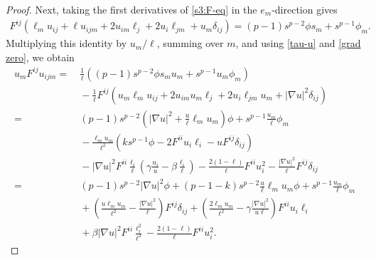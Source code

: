\documentclass[12pt]{amsart}
\numberwithin{equation}{section}
\newcommand{\8}{\infty}
\newcommand{\de}{\delta}
\newcommand{\eq}[1]{\begin{equation}\begin{alignedat}{2}#1\end{alignedat}\end{equation}}
\begin{document}
\begin{proof}
Next, taking the first derivatives of \eqref{s3:F-eq} in the $e_m$-direction gives
\eq{
F^{ij}(\ell_m u_{ij}+\ell u_{ijm}+2u_{im}\ell_j+2u_i\ell_{jm}+u_m\de_{ij})=(p-1)s^{p-2}\phi s_m +s^{p-1}\phi_m.
}
Multiplying this identity by $u_m/\ell$, summing over $m$, and using \eqref{tau-u} and \eqref{grad zero}, we obtain
\eq{
u_mF^{ij} u_{ijm}
=&~\frac{1}{\ell}((p-1)s^{p-2}\phi s_m u_m +s^{p-1}u_m \phi_m)\\
&~-\frac{1}{\ell}F^{ij}(u_m \ell_m u_{ij}+2u_{im}u_m\ell_j+2u_i\ell_{jm}u_m+|\nabla u|^2\de_{ij})\\
=&~(p-1)s^{p-2}\left(|\nabla u|^2+\frac{u}{\ell}\ell_mu_m\right) \phi+s^{p-1}\frac{u_m}{\ell} \phi_m\\
&~-\frac{\ell_m u_m }{\ell^2}(ks^{p-1}\phi-2F^{ii}u_i\ell_i-uF^{ij}\de_{ij})\\
&~-|\nabla u|^2F^{ii}\frac{\ell_i}{\ell} \left(\gamma\frac{u_i}{u}-\beta\frac{\ell_i}{\ell}\right)-\frac{2(1-\ell)}{\ell}F^{ii}u_i^2-\frac{|\nabla u|^2}{\ell} F^{ij}\de_{ij}\\
=&~(p-1)s^{p-2}|\nabla u|^2 \phi+(p-1-k)s^{p-2}\frac{u}{\ell}\ell_m u_m \phi+s^{p-1}\frac{u_m}{\ell} \phi_m\\
&~+\left(\frac{u\ell_m u_m }{\ell^2} -\frac{|\nabla u|^2}{\ell}\right)F^{ij}\de_{ij}+\left(\frac{2\ell_mu_m}{\ell^2}-\gamma\frac{|\nabla u|^2}{u\ell}\right)F^{ii}u_i\ell_i\\
&~+\beta|\nabla u|^2F^{ii}\frac{\ell_i^2}{\ell^2}-\frac{2(1-\ell)}{\ell}F^{ii}u_i^2.
}


\end{proof}
\end{document}
